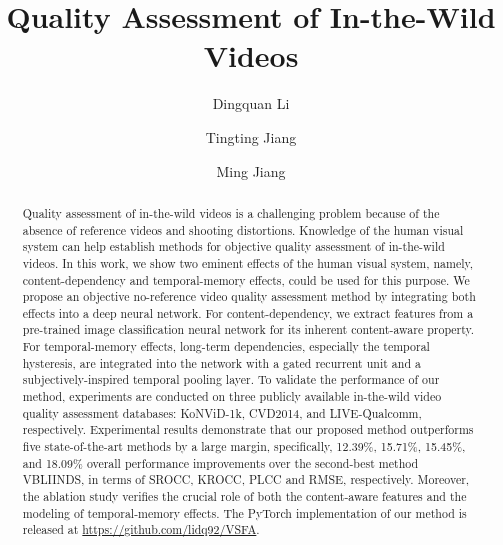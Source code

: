 \documentclass[sigconf]{acmart}
\begin{document}
\fancyhead{}

\title[Quality Assessment of In-the-Wild Videos]{Quality Assessment of In-the-Wild Videos}



 \author{Dingquan Li}
 
 \author{Tingting Jiang}

 \author{Ming Jiang}

\renewcommand{\shortauthors}{D. Li, T. Jiang, and M. Jiang}

\begin{abstract}
Quality assessment of in-the-wild videos is a challenging problem because of the absence of reference videos and shooting distortions. 
Knowledge of the human visual system can help establish methods for objective quality assessment of in-the-wild videos.
In this work, we show two eminent effects of the human visual system, namely,  content-dependency and temporal-memory effects, could be used for this purpose. 
We propose an objective no-reference video quality assessment method by integrating both effects into a deep neural network.  
For content-dependency, we extract features from a pre-trained image classification neural network for its inherent content-aware property. 
For temporal-memory effects, long-term dependencies, especially the temporal hysteresis, are integrated into the network with a gated recurrent unit and a subjectively-inspired temporal pooling layer.
To validate the performance of our method, experiments are conducted on three publicly available in-the-wild video quality assessment databases: KoNViD-1k, CVD2014, and LIVE-Qualcomm, respectively. 
Experimental results demonstrate that our proposed method outperforms five state-of-the-art methods by a large margin, specifically, 12.39\%, 15.71\%, 15.45\%, and 18.09\% overall performance improvements over the second-best method VBLIINDS, in terms of SROCC, KROCC, PLCC  and RMSE, respectively. 
Moreover, the ablation study verifies the crucial role of both the content-aware features and the modeling of temporal-memory effects. The PyTorch implementation of our method is released at \url{https://github.com/lidq92/VSFA}.
\end{abstract}
\end{document}

